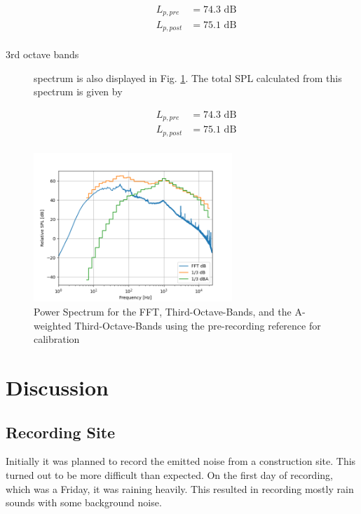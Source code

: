 \documentclass[twocolumn]{article}
\begin{document}
\begin{description}
\begin{equation}
\begin{aligned}
    L_{p,pre} & = 74.3 \textrm{ dB} \\
    L_{p,post} & = 75.1 \textrm{ dB} \\
\end{aligned}
\end{equation}

\item[3rd octave bands] spectrum is also displayed in Fig. \ref{fig:power_spectrum}.
    The total SPL calculated from this spectrum is given by

\begin{equation}
\begin{aligned}
    L_{p,pre} & = 74.3 \textrm{ dB} \\
    L_{p,post} & = 75.1 \textrm{ dB} \\
\end{aligned}
\end{equation}

\end{description}

\begin{figure}[H]
    \centering
    \includegraphics[width=75mm]{./Images/spectrum_plot_step.png}
    \caption{Power Spectrum for the FFT, Third-Octave-Bands, and the A-weighted Third-Octave-Bands using the
    pre-recording reference for calibration}
    \label{fig:power_spectrum}
\end{figure}


\section{Discussion}
\subsection{Recording Site}
Initially it was planned to record the emitted noise from a construction site.
This turned out to be more difficult than expected.
On the first day of recording, which was a Friday, it was raining heavily.
This resulted in recording mostly rain sounds with some background noise.
\end{document}
